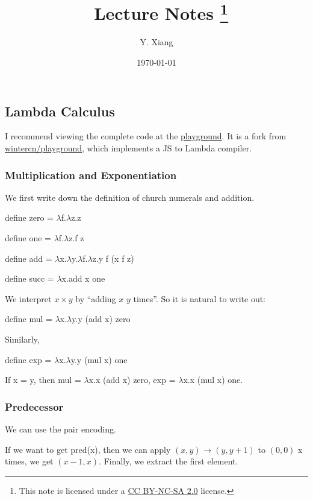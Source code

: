 \documentclass{article}
\title{\vspace{-3em}\course\, Lecture Notes \asnum\footnote{This note is licensed under a \href{https://creativecommons.org/licenses/by-nc-sa/2.0/}{CC BY-NC-SA 2.0} license.}}
\author{Y. Xiang\vspace{1em}}
\date{\today\vspace{-1em}}
\theoremstyle{definition}
\newcommand{\lb}{$\lambda$}
\begin{document}
\maketitle
\subsection{Lambda Calculus}

I recommend viewing the complete code at the \href{https://linsyking.github.io/lambda-playground/lambda.html?source=gist:93613afa70a3065aa03a989e5e7b537d}{playground}.
It is a fork from \href{https://github.com/wintercn/playground}{wintercn/playground}, which implements a JS to Lambda compiler.

\subsubsection*{Multiplication and Exponentiation}
We first write down the definition of church numerals and addition.

\begin{tcolorbox}
    \textsf{define} zero = \lb f.\lb z.z

    \textsf{define} one = \lb f.\lb z.f z

    \textsf{define} add = \lb x.\lb y.\lb f.\lb z.y f (x f z)

    \textsf{define} succ = \lb x.add x one
\end{tcolorbox}

We interpret $x\times y$ by ``adding $x$ $y$ times''. So it is natural to write out:

\begin{tcolorbox}
    \textsf{define} mul = \lb x.\lb y.y (add x) zero
\end{tcolorbox}

Similarly,

\begin{tcolorbox}
    \textsf{define} exp = \lb x.\lb y.y (mul x) one
\end{tcolorbox}

If x = y, then mul = \lb x.x (add x) zero, exp = \lb x.x (mul x) one.

\subsubsection*{Predecessor}

We can use the \textsf{pair} encoding.

If we want to get \textsf{pred}(x), then we can apply $(x, y) \rightarrow (y, y+1)$ to $(0, 0)$ x times, we get $(x-1,x)$.
Finally, we extract the first element.
\end{document}
